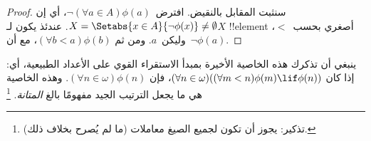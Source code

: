 \documentclass[../../../include/open-logic-section]{subfiles}
\begin{document}
\begin{proof}
سنثبت المقابل بالنقيض. افترض~$\lnot(\forall a \in A)\phi(a)$، أي إن
$X = \Setabs{x \in A}{\lnot\phi(x)} \neq \emptyset$. عندئذ يكون
لـ$X$ !!{element} أصغري بحسب~$<$، وليكن~$a$. ومن ثم
$(\forall b < a)\phi(b)$، مع أن~$\lnot \phi(a)$.
\end{proof}\noindent
ينبغي أن تذكرك هذه الخاصية الأخيرة بمبدأ الاستقراء القوي على الأعداد
الطبيعية، أي: إذا كان
$(\forall n \in \omega)((\forall m < n)\phi(m) \lif \phi(n))$، فإن
$(\forall n \in \omega)\phi(n)$. وهذه الخاصية هي ما يجعل الترتيب
الجيد مفهومًا بالغ \emph{المتانة}.
\footnote{تذكير: يجوز أن تكون لجميع الصيغ معاملات (ما لم يُصرح بخلاف ذلك).}
\end{document}
